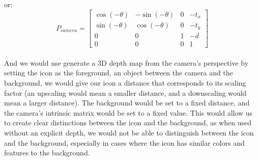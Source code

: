 or:
\[
    P_{camera} =
    \begin{bmatrix}
        \cos(-\theta) & -\sin(-\theta) & 0 & -t_x \\
        \sin(-\theta) & \cos(-\theta)  & 0 & -t_y \\
        0             & 0              & 1 & -d   \\
        0             & 0              & 0 & 1
    \end{bmatrix}
\]\\
And we would use generate a 3D depth map from the camera's perspective by setting the icon as the foreground, an object between the camera and the background, we would give our icon a distance that corresponds to its scaling factor (an upscaling would mean a smaller distance, and a downscaling would mean a larger distance). The background would be set to a fixed distance, and the camera's intrinsic matrix would be set to a fixed value. This would allow us to create clear distinctions between the icon and the background, as when used without an explicit depth, we would not be able to distinguish between the icon and the background, especially in cases where the icon has similar colors and features to the background.
